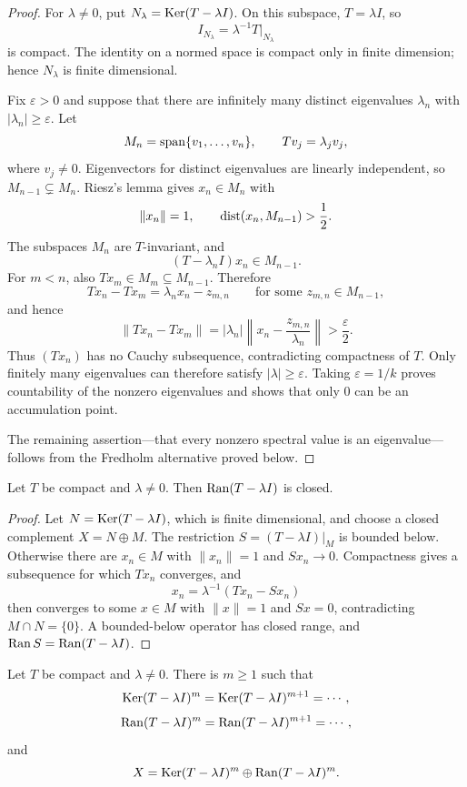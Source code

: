 \begin{proof}
For $\lambda\ne0$, put $N_\lambda=\operatorname{Ker}(T-\lambda I)$.  On this subspace,
$T=\lambda I$, so
\[
  I_{N_\lambda}=\lambda^{-1}T|_{N_\lambda}
\]
is compact.  The identity on a normed space is compact only in finite
dimension; hence $N_\lambda$ is finite dimensional.

Fix $\varepsilon>0$ and suppose that there are infinitely many distinct
eigenvalues $\lambda_n$ with $|\lambda_n|\ge\varepsilon$.  Let
\[
  M_n=\operatorname{span}\{v_1,\ldots,v_n\},
  \qquad Tv_j=\lambda_jv_j,
\]
where $v_j\ne0$.  Eigenvectors for distinct eigenvalues are linearly
independent, so $M_{n-1}\subsetneq M_n$.  Riesz's lemma gives
$x_n\in M_n$ with
\[
  \|x_n\|=1,
  \qquad \operatorname{dist}(x_n,M_{n-1})>\frac12.
\]
The subspaces $M_n$ are $T$-invariant, and
\[
  (T-\lambda_nI)x_n\in M_{n-1}.
\]
For $m<n$, also $Tx_m\in M_m\subseteq M_{n-1}$.  Therefore
\[
  Tx_n-Tx_m=\lambda_nx_n-z_{m,n}
  \qquad\text{for some }z_{m,n}\in M_{n-1},
\]
and hence
\[
  \|Tx_n-Tx_m\|
  =|\lambda_n|\left\|x_n-\frac{z_{m,n}}{\lambda_n}\right\|
  >\frac{\varepsilon}{2}.
\]
Thus $(Tx_n)$ has no Cauchy subsequence, contradicting compactness of $T$.
Only finitely many eigenvalues can therefore satisfy $|\lambda|\ge\varepsilon$.
Taking $\varepsilon=1/k$ proves countability of the nonzero eigenvalues and
shows that only $0$ can be an accumulation point.

The remaining assertion---that every nonzero spectral value is an
eigenvalue---follows from the Fredholm alternative proved below.
\end{proof}

\begin{noteproposition}
Let $T$ be compact and $\lambda\ne0$.  Then $\operatorname{Ran}(T-\lambda I)$ is closed.
\end{noteproposition}

\begin{proof}
Let $N=\operatorname{Ker}(T-\lambda I)$, which is finite dimensional, and choose a closed
complement $X=N\oplus M$.  The restriction
$S=(T-\lambda I)|_M$ is bounded below.  Otherwise there are $x_n\in M$ with
$\|x_n\|=1$ and $Sx_n\to0$.  Compactness gives a subsequence for which
$Tx_n$ converges, and
\[
  x_n=\lambda^{-1}(Tx_n-Sx_n)
\]
then converges to some $x\in M$ with $\|x\|=1$ and $Sx=0$, contradicting
$M\cap N=\{0\}$.  A bounded-below operator has closed range, and
$\operatorname{Ran} S=\operatorname{Ran}(T-\lambda I)$.
\end{proof}

\begin{notetheorem}
Let $T$ be compact and $\lambda\ne0$.  There is $m\ge1$ such that
\[
  \operatorname{Ker}(T-\lambda I)^m=\operatorname{Ker}(T-\lambda I)^{m+1}=\cdots,
\]
\[
  \operatorname{Ran}(T-\lambda I)^m=\operatorname{Ran}(T-\lambda I)^{m+1}=\cdots,
\]
and
\[
  X=\operatorname{Ker}(T-\lambda I)^m\oplus\operatorname{Ran}(T-\lambda I)^m.
\]
\end{notetheorem}

